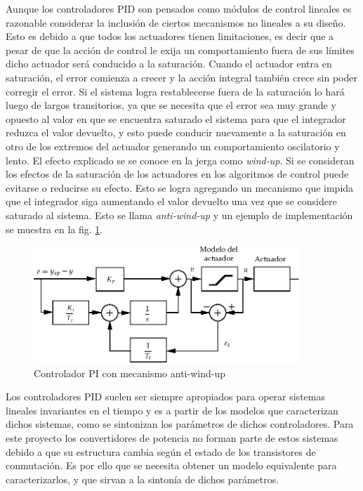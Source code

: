 Aunque los controladores PID son pensados como módulos de control lineales es razonable considerar la inclusión de ciertos mecanismos no lineales a su diseño.
Esto es debido a que todos los actuadores tienen limitaciones, es decir que a pesar de que la acción de control le exija un comportamiento fuera de sus límites
dicho actuador será conducido a la saturación. Cuando el actuador entra en saturación, el error comienza a crecer y la acción integral también crece sin poder
corregir el error. Si el sistema logra restablecerse fuera de la saturación lo hará luego de largos transitorios, ya que se necesita que el error sea muy
grande y opuesto al valor en que se encuentra saturado el sistema para que el integrador reduzca el valor devuelto, y esto puede conducir nuevamente
a la saturación en otro de los extremos del actuador generando un comportamiento oscilatorio y lento. El efecto explicado se se conoce en la jerga como
\emph{wind-up}. Si se consideran los efectos de la saturación de los actuadores en los algoritmos de control puede evitarse o reducirse su efecto. Esto se logra
agregando un mecanismo que impida que el integrador siga aumentando el valor devuelto una vez que se considere saturado al sistema. Esto se llama
\emph{anti-wind-up} y un ejemplo de implementación se muestra en la fig. \ref{fig:PI_anti-wind-up}.

\begin{figure}
 \centering
 \includegraphics[width=10cm]{gfx/PI_anti-wind-up.eps}
 \caption{Controlador PI con mecanismo anti-wind-up}
 \label{fig:PI_anti-wind-up}
\end{figure}

Los controladores PID suelen ser siempre apropiados para operar sistemas lineales invariantes en el tiempo y es a partir de los modelos que caracterizan dichos
sistemas, como se sintonizan los parámetros de dichos controladores. Para este proyecto los convertidores de potencia no forman parte de estos sistemas debido
a que su estructura cambia según el estado de los transistores de conmutación. Es por ello que se necesita obtener un modelo equivalente para caracterizarlos,
y que sirvan a la sintonía de dichos parámetros.

